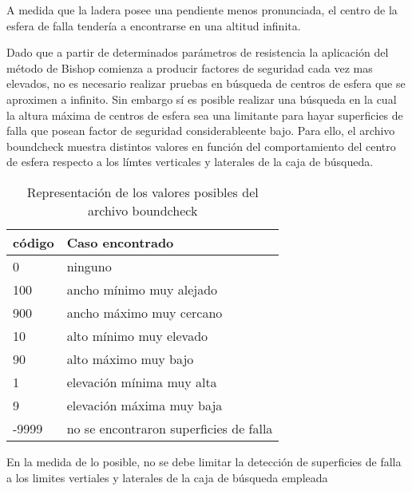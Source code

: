 A medida que la ladera posee una pendiente menos pronunciada, el centro de la esfera de falla tender\'ia a encontrarse en una altitud infinita.

Dado que a partir de determinados par\'ametros de resistencia la aplicaci\'on del m\'etodo de Bishop comienza a producir factores de seguridad cada vez mas elevados, no es necesario realizar pruebas en b\'usqueda de centros de esfera que se aproximen a infinito.
Sin embargo s\'i es posible realizar una b\'usqueda en la cual la altura m\'axima de centros de esfera sea una limitante para hayar superficies de falla que posean factor de seguridad  considerableente bajo. Para ello, el archivo boundcheck muestra distintos valores en funci\'on del comportamiento del centro de esfera respecto a los l\'imtes verticales y laterales de la caja de b\'usqueda.

\begin{table}[]
\centering
\caption{Representaci\'on de los valores posibles del archivo boundcheck}
\label{my-label}
\begin{tabular}{ll}
\hline
\multicolumn{1}{|l|}{\textbf{c\'odigo}} & \multicolumn{1}{l|}{\textbf{Caso encontrado}} \\ \hline
0                                     & ninguno                                           \\
100                                   & ancho m\'inimo muy alejado                          \\
900                                   & ancho m\'aximo muy cercano                          \\
10                                    & alto m\'inimo muy elevado                           \\
90                                    & alto m\'aximo muy bajo                              \\
1                                     & elevaci\'on m\'inima muy alta                         \\
9                                     & elevaci\'on m\'axima muy baja                         \\
-9999                                 & no se encontraron superficies de falla           
\end{tabular}
\label{boundcheckTable}
\end{table}

En la medida de lo posible, no se debe limitar la detecci\'on de superficies de falla a los limites vertiales y laterales de la caja de b\'usqueda empleada
